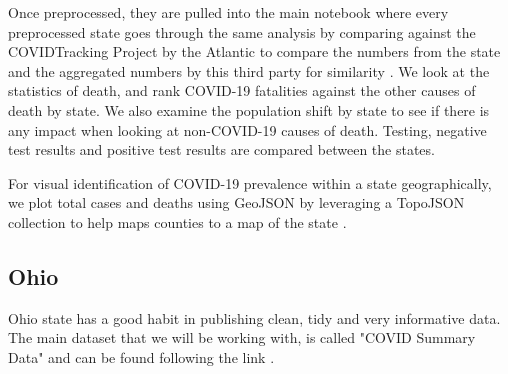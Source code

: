 \documentclass[conference]{IEEEtran}
\begin{document}
Once preprocessed, they are pulled into the main notebook where every preprocessed state goes through the same analysis by comparing against the COVIDTracking Project by the Atlantic to compare the numbers from the state and the aggregated numbers by this third party for similarity \cite{covid19tracking_covid_nodate}.
We look at the statistics of death, and rank COVID-19 fatalities against the other causes of death by state.
We also examine the population shift by state to see if there is any impact when looking at non-COVID-19 causes of death.
Testing, negative test results and positive test results are compared between the states.

For visual identification of COVID-19 prevalence within a state geographically, we plot total cases and deaths using GeoJSON by leveraging a TopoJSON collection to help maps counties to a map of the state \cite{eldersveld_topojson_nodate}.

\subsection{Ohio}
\label{Ohio}

Ohio state has a good habit in publishing clean, tidy and very informative data. The main dataset that we will be working with, is called "COVID Summary Data" and can be found following the link \cite{system_covid-19_nodate}.
\end{document}
